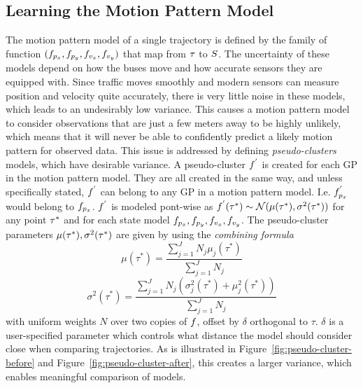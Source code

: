 \subsection{Learning the Motion Pattern Model}
The motion pattern model of a single trajectory is defined by the family of
function $(f_{p_x}, f_{p_y}, f_{v_x}, f_{v_y})$
that map from $\tau$ to $S$.
The uncertainty of these models depend on how the buses move and how
accurate sensors they are equipped with. Since traffic moves smoothly 
and modern sensors can measure position and velocity quite accurately, 
there is very little noise in these models, which leads to an undesirably low variance. 
This causes a motion pattern model to consider observations that are just a few
meters away to be highly unlikely, which means that it will never be
able to confidently predict a likely motion pattern for observed data.
This issue is addressed by defining \textit{pseudo-clusters} models,
which have desirable variance. 
A pseudo-cluster $f^{'}$ is created for each GP in the motion pattern
model. They are all created in the same way, and unless specifically
stated, $f^{'}$ can belong to any GP in a
motion pattern model. I.e. $f^{'}_{p_x}$ would belong to $f_{p_x}$.
$f^{'}$ is modeled pont-wise as
$f^{'}(\tau^*) \sim \mathcal{N}(\mu(\tau^*), \sigma^2(\tau^*))$
for any point $\tau^*$ and for each state model
$f_{p_x}, f_{p_y}, f_{v_x}, f_{v_y}$. The
pseudo-cluster parameters $\mu(\tau^*), \sigma^2(\tau^*)$ are given by using the
\textit{combining formula}~\cite{Tiger2015Jul}
\begin{equation}
  \label{eq:combining-formula-mu}
  \mu(\tau^{*}) = \frac{\sum_{j=1}^{J}N_{j}\mu_j(\tau^{*})}{\sum_{j=1}^{J}N_j}
\end{equation}
\begin{equation}
  \label{eq:combining-formula-sigma}
  \sigma^2(\tau^{*}) =
  \frac{\sum_{j=1}^{J}N_{j}(\sigma^2_j(\tau^{*}) + \mu_j^2(\tau^{*}))}{\sum_{j=1}^{J}N_j}
\end{equation}
with uniform weights $N$ over two copies of $f$, offset by
$\delta$ orthogonal to $\tau$. $\delta$ is a user-specified parameter
which controls what distance the model should consider close when
comparing trajectories. As is illustrated in Figure~\ref{fig:pseudo-cluster-before} and
Figure~\ref{fig:pseudo-cluster-after}, this creates a larger variance, 
which enables meaningful comparison of models.
